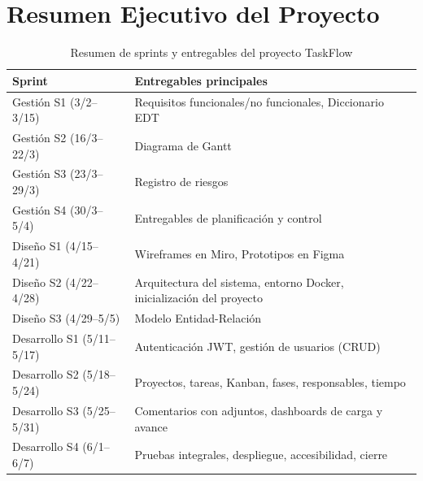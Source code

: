 \documentclass[12pt, a4paper]{article}
\begin{document}
\newpage
\section{Resumen Ejecutivo del Proyecto}

\begin{table}[H]
\centering
\renewcommand{\arraystretch}{1.4}
\begin{tabularx}{\linewidth}{|l|X|}
\hline
\rowcolor{lightblue}
\textbf{Sprint} & \textbf{Entregables principales} \\
\hline
Gestión S1 (3/2--3/15)   & Requisitos funcionales/no funcionales, Diccionario EDT \\
\hline
Gestión S2 (16/3--22/3)  & Diagrama de Gantt \\
\hline
Gestión S3 (23/3--29/3)  & Registro de riesgos \\
\hline
Gestión S4 (30/3--5/4)   & Entregables de planificación y control \\
\hline
\rowcolor{lightgreen}
Diseño S1 (4/15--4/21)   & Wireframes en Miro, Prototipos en Figma \\
\hline
\rowcolor{lightgreen}
Diseño S2 (4/22--4/28)   & Arquitectura del sistema, entorno Docker, inicialización del proyecto \\
\hline
\rowcolor{lightgreen}
Diseño S3 (4/29--5/5)    & Modelo Entidad-Relación \\
\hline
\rowcolor{lightorange}
Desarrollo S1 (5/11--5/17) & Autenticación JWT, gestión de usuarios (CRUD) \\
\hline
\rowcolor{lightorange}
Desarrollo S2 (5/18--5/24) & Proyectos, tareas, Kanban, fases, responsables, tiempo \\
\hline
\rowcolor{lightorange}
Desarrollo S3 (5/25--5/31) & Comentarios con adjuntos, dashboards de carga y avance \\
\hline
\rowcolor{lightorange}
Desarrollo S4 (6/1--6/7)   & Pruebas integrales, despliegue, accesibilidad, cierre \\
\hline
\end{tabularx}
\caption{Resumen de sprints y entregables del proyecto TaskFlow}
\end{table}

\vspace{0.5em}
\end{document}
